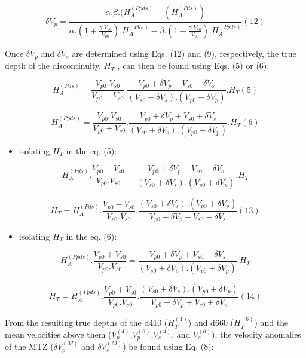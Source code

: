 \documentclass[11pt]{article}
\providecommand{\tightlist}{%
      \setlength{\itemsep}{0pt}\setlength{\parskip}{0pt}}
\begin{document}
    \[
\delta V_{p} = \frac{\alpha . \beta . (H_{A}^{(Ppds)} - (H_{A}^{(Pds)})}{\alpha . (1 + \frac{\gamma.V_{s0}}{V_{p0}}) . H_{A}^{(Pds)} - \beta . (1 - \frac{\gamma.V_{s0}}{V_{p0}}). H_{A}^{(Ppds)}} (12)
\] 

    Once \(\delta V_{p}\) and \(\delta V_{s}\) are determined using Eqs.
(12) and (9), respectively, the true depth of the discontinuity,
\(H_{T}\) , can then be found using Eqs. (5) or (6).

    \[
H_{A}^{(Pds)} = \frac{V_{p0} . V_{s0}}{V_{p0}-V_{s0}} . \frac{V_{p0} + \delta V_{p} - V_{s0} - \delta V_{s}}{(V_{s0} + \delta V_{s}) . (V_{p0} + \delta V_{p})} . H_{T} (5)
\]

    \[
H_{A}^{(Ppds)} = \frac{V_{p0} . V_{s0}}{V_{p0} + V_{s0}} . \frac{V_{p0} + \delta V_{p} + V_{s0} + \delta V_{s}}{(V_{s0} + \delta V_{s}) . (V_{p0} + \delta V_{p})} . H_{T} (6)
\]

    \begin{itemize}
\tightlist
\item
  isolating \(H_{T}\) in the eq. (5):
\end{itemize}

    \[
H_{A}^{(Pds)} . \frac{V_{p0}-V_{s0}}{V_{p0} . V_{s0}}  = \frac{V_{p0} + \delta V_{p} - V_{s0} - \delta V_{s}}{(V_{s0} + \delta V_{s}) . (V_{p0} + \delta V_{p})} . H_{T}
\]

    \[
 H_{T} = H_{A}^{(Pds)} . \frac{V_{p0}-V_{s0}}{V_{p0} . V_{s0}} . \frac{(V_{s0} + \delta V_{s}) . (V_{p0} + \delta V_{p})}{V_{p0} + \delta V_{p} - V_{s0} - \delta V_{s}} (13)
\] 

    \begin{itemize}
\tightlist
\item
  isolating \(H_{T}\) in the eq. (6):
\end{itemize}

    \[
H_{A}^{(Ppds)} . \frac{V_{p0} + V_{s0}}{V_{p0} . V_{s0}} = \frac{V_{p0} + \delta V_{p} + V_{s0} + \delta V_{s}}{(V_{s0} + \delta V_{s}) . (V_{p0} + \delta V_{p})} . H_{T}
\]

    \[
H_{T} = H_{A}^{(Ppds)} . \frac{V_{p0} + V_{s0}}{V_{p0} . V_{s0}} . \frac{(V_{s0} + \delta V_{s}) . (V_{p0} + \delta V_{p})}{V_{p0} + \delta V_{p} + V_{s0} + \delta V_{s}}(14)
\] 

    From the resulting true depths of the d410 (\(H_{T}^{(4)}\)) and d660
(\(H_{T}^{(6)}\)) and the mean velocities above them
(\(V_{p}^{(4)}\),\(V_{p}^{(6)}\),\(V_{s}^{(4)}\), and \(V_{s}^{(6)}\)),
the velocity anomalies of the MTZ (\(\delta V_{p}^{(M)}\) and
\(\delta V_{s}^{(M)}\)) be found using Eq. (8):
\end{document}
